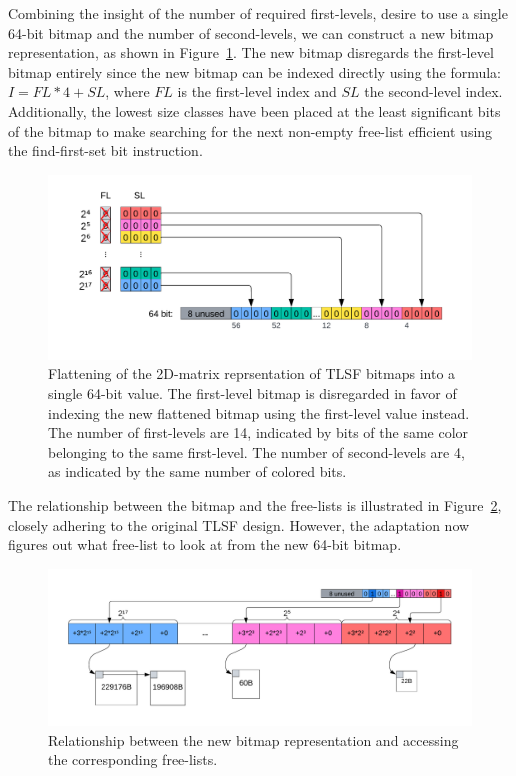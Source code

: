 Combining the insight of the number of required first-levels, desire to use a single 64-bit bitmap and the number of second-levels, we can construct a new bitmap representation, as shown in Figure~\ref{fig:bitmap_flattening}. The new bitmap disregards the first-level bitmap entirely since the new bitmap can be indexed directly using the formula: $I = FL * 4 + SL$, where $FL$ is the first-level index and $SL$ the second-level index. Additionally, the lowest size classes have been placed at the least significant bits of the bitmap to make searching for the next non-empty free-list efficient using the find-first-set bit instruction.

\begin{figure}[H]
    \centering
    \includegraphics[width=1\textwidth]{figures/bitmap_flattening.png}
    \caption{Flattening of the 2D-matrix reprsentation of TLSF bitmaps into a single 64-bit value. The first-level bitmap is disregarded in favor of indexing the new flattened bitmap using the first-level value instead. The number of first-levels are 14, indicated by bits of the same color belonging to the same first-level. The number of second-levels are 4, as indicated by the same number of colored bits.}
    \label{fig:bitmap_flattening}
\end{figure}

The relationship between the bitmap and the free-lists is illustrated in Figure~\ref{fig:bitmap_relationship}, closely adhering to the original TLSF design. However, the adaptation now figures out what free-list to look at from the new 64-bit bitmap.

\begin{figure}[H]
    \centering
    \includegraphics[width=1\textwidth]{figures/bitmap_relationship.png}
    \caption{Relationship between the new bitmap representation and accessing the corresponding free-lists.}
    \label{fig:bitmap_relationship}
\end{figure}

